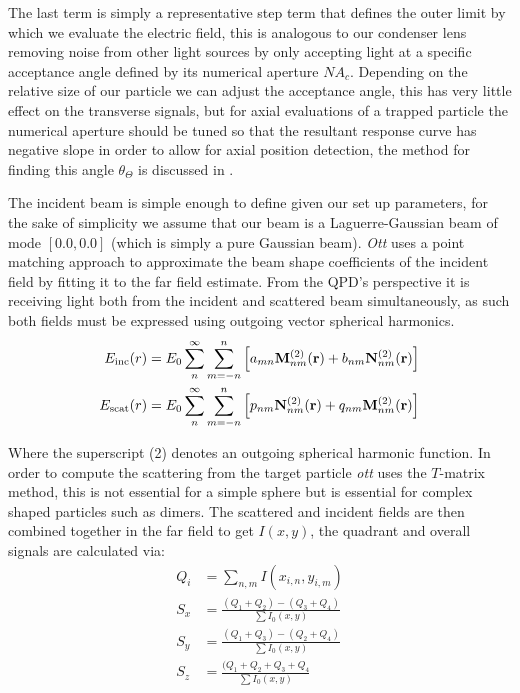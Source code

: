 The last term is simply a representative step term that defines 
the outer limit by which we evaluate the electric field, this is 
analogous to our condenser lens removing noise from other light 
sources by only accepting light at a specific acceptance angle 
defined by its numerical aperture $NA_c$. Depending on the 
relative size of our particle we can adjust the acceptance angle, 
this has very little effect on the transverse signals, but for 
axial evaluations of a trapped particle the numerical aperture 
should be tuned so that the resultant response curve has negative 
slope in order to allow for axial position detection, the method 
for finding this angle $\theta_\Theta$ is discussed in \cite{Friedrich2012}.

The incident beam is simple enough to define given our set up 
parameters, for the sake of simplicity we assume that our beam is a Laguerre-Gaussian 
beam of mode $[0.0, 0.0]$ (which is simply a pure Gaussian beam). 
\textit{Ott} uses a point matching approach to approximate the beam shape 
coefficients of the incident field by fitting it to the far field estimate. 
From the QPD's perspective it is receiving light both from the incident 
and scattered beam simultaneously, as such both fields must be expressed
using outgoing vector spherical harmonics.
\begin{align}
	E_{\rm inc}(r)&=
	E_0\sum^\infty_{n}\sum^n_{m=-n}\left[a_{mn}{\bf M}^{(2)}_{nm}({\bf r})+
	b_{nm}{\bf N}^{(2)}_{nm}({\bf r}) \right] 
	\\
	E_{\rm scat}(r)&=E_0 \sum^\infty_n \sum^n_{m=-n} \left[
	p_{nm}{\bf N}_{nm}^{(2)}({\bf r})+q_{nm}{\bf M}_{nm}^{(2)}({\bf r})
	\right] 
\end{align}

Where the superscript (2) denotes an outgoing spherical harmonic
function. In order to compute the scattering from the target particle \textit{ott} uses the $T$-matrix method, this is not essential 
for a simple sphere but is essential for complex shaped particles 
such as dimers. The scattered and incident fields are then combined 
together in the far field to get $I(x,y)$, the quadrant and overall 
signals are calculated via:
\begin{align}
	Q_i &= \sum_{n,m} I(x_{i,n}, y_{i,m}) \\
	S_{x} &= \frac{(Q_1+Q_2)-(Q_3+Q_4)}{\sum I_0(x,y)} \\
	S_{y} &= \frac{(Q_1+Q_3)-(Q_2+Q_4)}{\sum I_0(x,y)} \\
	S_{z} &= \frac{(Q_1+Q_2+Q_3+Q_4}{\sum I_0(x,y)}
\end{align}

